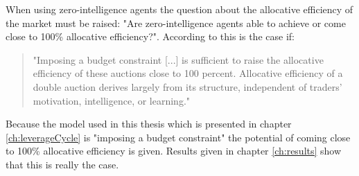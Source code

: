 \documentclass[../Bachelorarbeit.tex]{subfiles}
\begin{document}
\medskip
When using zero-intelligence agents the question about the \gls{allocative efficiency} of the market must be raised: "Are zero-intelligence agents able to achieve or come close to 100\% allocative efficiency?". According to \cite{GodeSunder1993} this is the case if:

\begin{quote}
"Imposing a budget constraint [...] is sufficient to raise the allocative efficiency of these auctions close to 100 percent. Allocative efficiency of a double auction derives largely from its structure, independent of traders' motivation, intelligence, or learning."
\end{quote}

Because the model used in this thesis which is presented in chapter \ref{ch:leverageCycle} is "imposing a budget constraint" the potential of coming close to 100\% allocative efficiency is given. Results given in chapter \ref{ch:results} show that this is really the case.
\end{document}

